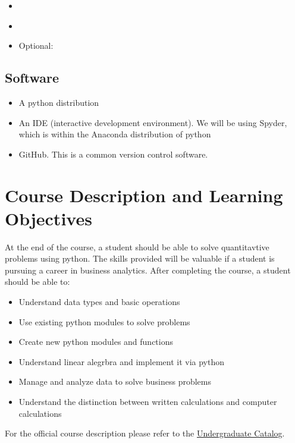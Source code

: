 \documentclass[11pt]{paper}
\begin{document}
\begin{itemize}
\item \citet{griesetal:2017}

\item \citet{taddy:2019}

\item Optional:  \citet{adledore:2014}

\end{itemize}

\subsection{Software}
\begin{itemize}
\item A python distribution
\item An IDE (interactive development environment). We will be using Spyder, which is within the Anaconda distribution of python
\item GitHub. This is a common version control software.
\end{itemize}

\section{Course Description and Learning Objectives}

At the end of the course, a student should be able to solve quantitavtive problems using python. The skills provided will be valuable if a student is pursuing a career in business analytics. After completing the course, a student should be able to:

\begin{itemize}
\item Understand data types and basic operations
\item Use existing python modules to solve problems
\item Create new python modules and functions
\item Understand linear alegrbra and implement it via python
\item Manage and analyze data to solve business problems
\item Understand the distinction between written calculations and computer calculations 
\end{itemize}

For the official course description please refer to the \href{http://catalog.ucf.edu/search_advanced.php?catoid=14}{Undergraduate Catalog}.
\end{document}
